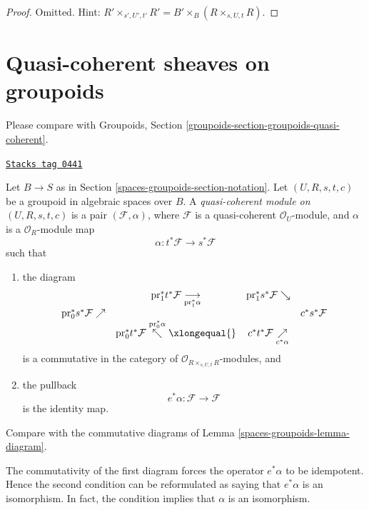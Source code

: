 \begin{proof}
Omitted. Hint:
$R' \times_{s', U', t'} R' = B' \times_B (R \times_{s, U, t} R)$.
\end{proof}

\section{Quasi-coherent sheaves on groupoids}
\label{spaces-groupoids-section-groupoids-quasi-coherent}
Please compare with
Groupoids, Section \ref{groupoids-section-groupoids-quasi-coherent}.

\begin{definition}
\label{spaces-groupoids-definition-groupoid-module}
\href{https://stacks.math.columbia.edu/tag/0441}{\texttt{Stacks tag 0441}}

Let $B \to S$ as in Section \ref{spaces-groupoids-section-notation}.
Let $(U, R, s, t, c)$ be a groupoid in algebraic spaces over $B$.
A {\it quasi-coherent module on $(U, R, s, t, c)$}
is a pair $(\mathcal{F}, \alpha)$, where $\mathcal{F}$ is a quasi-coherent
$\mathcal{O}_U$-module, and $\alpha$ is a $\mathcal{O}_R$-module
map
$$
\alpha : t^*\mathcal{F} \longrightarrow s^*\mathcal{F}
$$
such that
\begin{enumerate}
\item the diagram
$$
\begin{array}{cccc} & \text{pr}_1^*t^*\mathcal{F} \underset{\text{pr}_1^*\alpha}{\longrightarrow} & \text{pr}_1^*s^*\mathcal{F} \searrow &  \\ \text{pr}_0^*s^*\mathcal{F} \nearrow &  &  & c^*s^*\mathcal{F} \\  & \text{pr}_0^*t^*\mathcal{F} \overset{\text{pr}_0^*\alpha}{\nwarrow}\xlongequal{} & c^*t^*\mathcal{F} \underset{c^*\alpha}{\nearrow} & \end{array}
$$
is a commutative in the category of
$\mathcal{O}_{R \times_{s, U, t} R}$-modules, and
\item the pullback
$$
e^*\alpha : \mathcal{F} \longrightarrow \mathcal{F}
$$
is the identity map.
\end{enumerate}
Compare with the commutative diagrams of Lemma \ref{spaces-groupoids-lemma-diagram}.
\end{definition}

The commutativity of the first diagram forces the operator $e^*\alpha$
to be idempotent. Hence the second condition can be reformulated as saying
that $e^*\alpha$ is an isomorphism. In fact, the condition implies that
$\alpha$ is an isomorphism.

